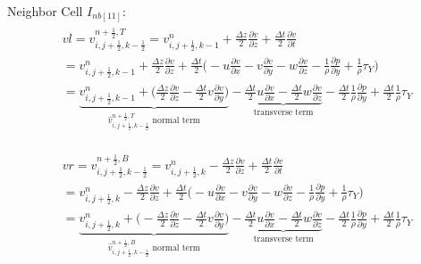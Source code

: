 \documentclass{article}
\numberwithin{equation}{subsection}
\begin{document}
Neighbor Cell $I_{nb[11]}$:
\begin{align}
\begin{split}
& vl = v_{i,j+\frac{1}{2},k-\frac{1}{2}}^{n+\frac{1}{2},T} = v_{i,j+\frac{1}{2},k-1}^n + \frac{\Delta z}{2}\frac{\partial v}{\partial z} + \frac{\Delta t}{2}\frac{\partial v}{\partial t} \\
&= v_{i,j+\frac{1}{2},k-1}^n + \frac{\Delta z}{2} \frac{\partial v}{\partial z} + \frac{\Delta t}{2} \Big( -u\frac{\partial v}{\partial x} -v\frac{\partial v}{\partial y} -w\frac{\partial v}{\partial z} - \frac{1}{\rho}\frac{\partial p}{\partial y} +\frac{1}{\rho}\tau_Y\Big) \\
&= \underbrace{v_{i,j+\frac{1}{2},k-1}^n + \Big(\frac{\Delta z}{2}\frac{\partial v}{\partial z} - \frac{\Delta t}{2} v\frac{\partial v}{\partial y}\Big)}_\text{$\widehat{v}_{i,j+\frac{1}{2},k-\frac{1}{2}}^{n+\frac{1}{2},T}$ normal term} -\underbrace{\frac{\Delta t}{2}u\frac{\partial v}{\partial x} - \frac{\Delta t}{2}w\frac{\partial v}{\partial z}}_\text{transverse term} - \frac{\Delta t}{2}\frac{1}{\rho}\frac{\partial p}{\partial y} + \frac{\Delta t}{2}\frac{1}{\rho}\tau_Y
\end{split}
\end{align}

\begin{align}
\begin{split}
& vr = v_{i,j+\frac{1}{2},k-\frac{1}{2}}^{n+\frac{1}{2},B} = v_{i,j+\frac{1}{2},k}^n - \frac{\Delta z}{2}\frac{\partial v}{\partial z} + \frac{\Delta t}{2}\frac{\partial v}{\partial t} \\
&= v_{i,j+\frac{1}{2},k}^n - \frac{\Delta z}{2} \frac{\partial v}{\partial z} + \frac{\Delta t}{2} \Big( -u\frac{\partial v}{\partial x} -v\frac{\partial v}{\partial y} -w\frac{\partial v}{\partial z} - \frac{1}{\rho}\frac{\partial p}{\partial y} +\frac{1}{\rho}\tau_Y\Big) \\
&= \underbrace{v_{i,j+\frac{1}{2},k}^n + \Big(-\frac{\Delta z}{2}\frac{\partial v}{\partial z} - \frac{\Delta t}{2} v\frac{\partial v}{\partial y}\Big)}_\text{$\widehat{v}_{i,j+\frac{1}{2},k-\frac{1}{2}}^{n+\frac{1}{2},B}$ normal term} -\underbrace{\frac{\Delta t}{2}u\frac{\partial v}{\partial x} - \frac{\Delta t}{2}w\frac{\partial v}{\partial z}}_\text{transverse term} - \frac{\Delta t}{2}\frac{1}{\rho}\frac{\partial p}{\partial y} + \frac{\Delta t}{2}\frac{1}{\rho}\tau_Y
\end{split}
\end{align}
\end{document}
